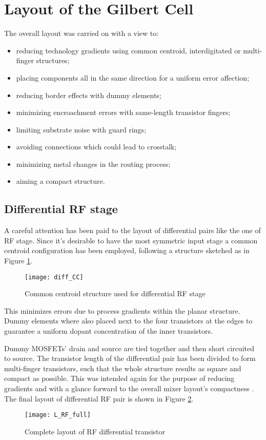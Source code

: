 \textbf{\newpage
	\thispagestyle{empty}
\clearpage\mbox{}\clearpage}
\section{Layout of the Gilbert Cell}
The overall layout was carried on with a view to:
\begin{itemize}
	\item reducing technology gradients using common centroid, interdigitated or multi-finger structures;
	\item placing components all in the same direction for a uniform error affection;
	\item reducing border effects with dummy elements;
	\item minimizing encroachment errors with same-length transistor fingers;
 	\item limiting substrate noise with guard rings;
	\item avoiding connections which could lead to crosstalk;
	\item minimizing metal changes in the routing process;
	\item aiming a compact structure.
\end{itemize}
\subsection{Differential RF stage}
A careful attention has been paid to the layout of differential pairs like the one of RF stage. Since it's desirable to have the most symmetric input stage a common centroid configuration has been employed, following a structure sketched as in Figure \ref{fig:diff_CC}. 

\begin{figure}[H]
	\centering
	\texttt{[image: diff\_CC]}
	\caption{Common centroid structure used for differential RF stage}
	\label{fig:diff_CC}
\end{figure}
This minimizes errors due to process gradients within the planar structure. Dummy elements where also placed next to the four transistors at the edges to guarantee a uniform dopant concentration of the inner transistors.

Dummy MOSFETs' drain and source are tied together and then short circuited to source.
The transistor length of the differential pair has been divided to form multi-finger  transistors, such that the whole structure results as square and compact as possible. This was intended again for the purpose of reducing gradients and with a glance forward to the overall mixer layout's compactness . The final layout of differential RF pair is shown in Figure \ref{L_RF_full}.
\begin{figure}[H]
	\centering
	\texttt{[image: L\_RF\_full]}
	\caption{Complete layout of RF differential transistor}
	\label{L_RF_full}
\end{figure}

